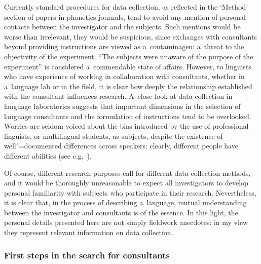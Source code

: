 Currently standard procedures for data collection, as reflected in the ‘Method’ section of papers in
phonetics journals, tend to avoid any mention of personal contacts between the investigator and the
subjects. Such mentions would be worse than irrelevant, they would be suspicious, since exchanges
with consultants beyond providing instructions are viewed as a~contaminagen: a~threat to
the objectivity of the experiment. “The
subjects were unaware of the purpose of the experiment” is considered a~commendable state of
affairs. However, to linguists who have experience of working in
collaboration with consultants, whether in a~language lab or in the field, it is clear how deeply
the relationship established with the consultant influences research. A~close look at data
collection in language laboratories suggests that important dimensions in the selection of language consultants
and the formulation of instructions tend to be overlooked. Worries are seldom voiced about the bias
introduced by the use of professional linguists, or multilingual students, as subjects, despite the existence of well"=documented differences across speakers: clearly, different people have different abilities (see e.g.~\citealt{audibertetal2008}). 

Of course, different research purposes call for different data collection methods, and it
would be thoroughly unreasonable to expect all investigators to develop personal familiarity
with subjects who participate in their research. Nevertheless, it is clear that, in the process of
describing a~language, mutual understanding between the investigator and consultants is of the
essence. In this light, the personal details presented here are not simply fieldwork anecdotes: in
my view they represent relevant information on data collection.


\subsubsection{First steps in the search for consultants}
\label{sec:firststepsinthesearchforconsultants}

